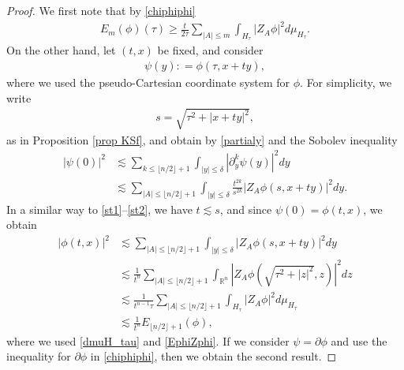 \documentclass{article}
\newcommand{\bbr}{{\mathbb R}}
\begin{document}
\begin{proof}
We first note that by \eqref{chiphiphi}
\begin{align}
E_m ( \phi ) ( \tau ) \geq \frac{ t }{ 2 \tau } \sum_{ | A | \leq m } \int_{ H_\tau } | Z_A \phi |^2 d \mu_{ H_\tau } . \label{EphiZphi}
\end{align}
On the other hand, let $ ( t , x ) $ be fixed, and consider
\begin{align*}
\psi ( y ) : = \phi ( \tau , x + t y ) ,
\end{align*}
where we used the pseudo-Cartesian coordinate system for $ \phi $. For simplicity, we write 
\begin{align*}
s = \sqrt{ \tau^2 + | x + t y |^2 } ,
\end{align*}
as in Proposition \ref{prop KSf}, and obtain by \eqref{partialy} and the Sobolev inequality
\begin{align*}
| \psi ( 0 ) |^2 & \lesssim \sum_{ k \leq \lfloor n / 2 \rfloor +1 } \int_{ | y | \leq \delta } | \partial_y^k \psi ( y ) |^2 d y \\
& \lesssim \sum_{ | A | \leq \lfloor n / 2 \rfloor +1 } \int_{ | y | \leq \delta } \frac{ t^{ 2 k } }{ s^{ 2 k } } \left| Z_A \phi ( s , x + t y ) \right|^2 d y .
\end{align*}
In a similar way to \eqref{st1}--\eqref{st2}, we have $ t \lesssim s $, and since $ \psi ( 0 ) = \phi ( t , x ) $, we obtain
\begin{align*}
| \phi ( t , x ) |^2 & \lesssim \sum_{ | A | \leq \lfloor n / 2 \rfloor + 1 } \int_{ | y | \leq \delta } \left| Z_A \phi ( s , x + t y ) \right|^2 d y \\
& \lesssim \frac{ 1 }{ t^n } \sum_{ | A | \leq \lfloor n / 2 \rfloor + 1 } \int_{ \bbr^n } \left| Z_A \phi \left( \sqrt{ \tau^2 + | z |^2 } , z \right) \right|^2 d z \\
& \lesssim \frac{ 1 }{ t^{ n - 1 } \tau } \sum_{ | A | \leq \lfloor n / 2 \rfloor +1 } \int_{ H_\tau } | Z_A \phi |^2 d \mu_{ H_\tau } \\
& \lesssim \frac{ 1 }{ t^n } E_{ \lfloor n / 2 \rfloor + 1 } ( \phi ) ,
\end{align*}
where we used \eqref{dmuH_tau} and \eqref{EphiZphi}. If we consider $ \psi = \partial \phi $ and use the inequality for $ \partial \phi $ in \eqref{chiphiphi}, then we obtain the second result. 
\end{proof}
\end{document}

